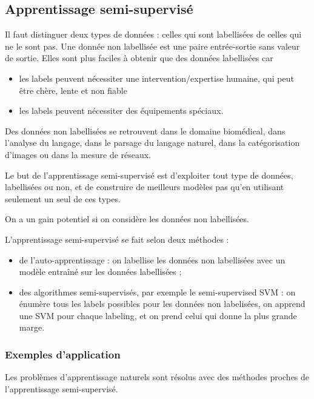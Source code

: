 		\subsection{Apprentissage semi-supervisé}
		
		Il faut distinguer deux types de données : celles qui sont labellisées de celles qui ne le sont pas. Une donnée non labellisée est une paire entrée-sortie sans valeur de sortie. Elles sont plus faciles à obtenir que des données labellisées car
		
		\begin{itemize}
			\item les labels peuvent nécessiter une intervention/expertise humaine, qui peut être chère, lente et non fiable
			\item les labels peuvent nécessiter des équipements spéciaux.
		\end{itemize}
		
		Des données non labellisées se retrouvent dans le domaine biomédical, dans l'analyse du langage, dans le parsage du langage naturel, dans la catégorisation d'images ou dans la mesure de réseaux.
				
		Le but de l'apprentissage semi-supervisé est d'exploiter tout type de données, labellisées ou non, et de construire de meilleurs modèles pas qu'en utilisant seulement un seul de ces types.
		
		On a un gain potentiel si on considère les données non labellisées.
		
		
		L'apprentissage semi-supervisé se fait selon deux méthodes :
		\begin{itemize}
			\item de l'auto-apprentissage : on labellise les données non labellisées avec un modèle entraîné sur les données labellisées ;
			\item des algorithmes semi-supervisés, par exemple le semi-supervised SVM : on énumère tous les labels possibles pour les données non labelisées, on apprend une SVM pour chaque labeling, et on prend celui qui donne la plus grande marge.
		\end{itemize}
			
			\subsubsection{Exemples d'application}
			
			Les problèmes d'apprentissage naturels sont résolus avec des méthodes proches de l'apprentissage semi-supervisé.
			
